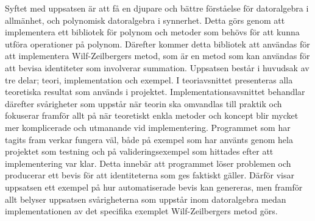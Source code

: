 Syftet med uppsatsen är att få en djupare och bättre förståelse för datoralgebra i allmänhet, och polynomisk datoralgebra i synnerhet. Detta görs genom att implementera ett bibliotek för polynom och metoder som behövs för att kunna utföra operationer på polynom. Därefter kommer detta bibliotek att användas för att implementera Wilf-Zeilbergers metod, som är en metod som kan användas för att bevisa identiteter som involverar summation. Uppsatsen består i huvudsak av tre delar; teori, implementation och exempel. I teoriavsnittet presenteras alla teoretiska resultat som används i projektet. Implementationsavsnittet behandlar därefter svårigheter som uppstår när teorin ska omvandlas till praktik och fokuserar framför allt på när teoretiskt enkla metoder och koncept blir mycket mer komplicerade och utmanande vid implementering. Programmet som har tagits fram verkar fungera väl, både på exempel som har använts genom hela projektet som testning och på valideringsexempel som hittades efter att implementering var klar. Detta innebär att programmet löser problemen och producerar ett bevis för att identiteterna som ges faktiskt gäller. Därför visar uppsatsen ett exempel på hur automatiserade bevis kan genereras, men framför allt belyser uppsatsen svårigheterna som uppstår inom datoralgebra medan implementationen av det specifika exemplet Wilf-Zeilbergers metod görs.

